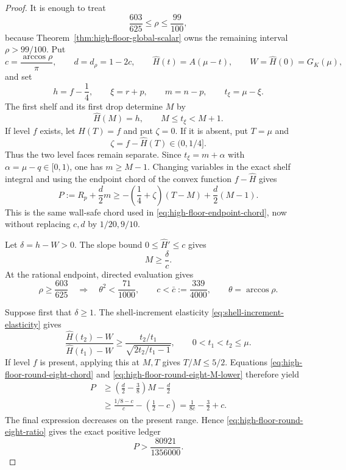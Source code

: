 \documentclass[11pt]{article}
\theoremstyle{remark}
\begin{document}
\begin{proof}
It is enough to treat
\[
 \frac{603}{625}\leq\rho\leq\frac{99}{100},
\]
because Theorem~\ref{thm:high-floor-global-scalar} owns the remaining
interval $\rho>99/100$.  Put
\[
 c=\frac{\arccos\rho}{\pi},\qquad d=d_\rho=1-2c,
 \qquad \widehat H(t)=A(\mu-t),\qquad
 W=\widehat H(0)=G_K(\mu),
\]
and set
\[
 h=f-\frac14,\qquad \xi=r+p,\qquad m=n-p,
 \qquad t_\xi=\mu-\xi.
\]
The first shelf and its first drop determine $M$ by
\[
 \widehat H(M)=h,\qquad M\leq t_\xi<M+1.
\]
If level $f$ exists, let $\widehat H(T)=f$ and put $\zeta=0$.
If it is absent, put $T=\mu$ and
\[
 \zeta=f-\widehat H(T)\in(0,1/4].
\]
Thus the two level faces remain separate.  Since
$t_\xi=m+\alpha$ with $\alpha=\mu-q\in[0,1)$, one has $m\geq M-1$.
Changing variables in the exact shelf integral and using the endpoint
chord of the convex function $f-\widehat H$ gives
\begin{equation}
 \boxed{
 P:=R_p+\frac d2m
 \geq-\left(\frac14+\zeta\right)(T-M)
       +\frac d2(M-1).}
 \label{eq:high-floor-round-eight-chord}
\end{equation}
This is the same wall-safe chord used in
\eqref{eq:high-floor-endpoint-chord}, now without replacing $c,d$ by
$1/20,9/10$.

Let $\delta=h-W>0$.  The slope bound
$0\leq\widehat H'\leq c$ gives
\begin{equation}
 M\geq\frac{\delta}{c}.
 \label{eq:high-floor-round-eight-M-lower}
\end{equation}
At the rational endpoint, directed evaluation gives
\begin{equation}
 \rho\geq\frac{603}{625}
 \quad\Longrightarrow\quad
 \theta^2<\frac{71}{1000},\qquad
 c<\bar c:=\frac{339}{4000},
 \qquad \theta=\arccos\rho.
 \label{eq:high-floor-round-eight-ratio}
\end{equation}

Suppose first that $\delta\geq1$.  The shell-increment elasticity
\eqref{eq:shell-increment-elasticity} gives
\begin{equation}
 \frac{\widehat H(t_2)-W}{\widehat H(t_1)-W}
 \geq\frac{t_2/t_1}{\sqrt{2t_2/t_1-1}},
 \qquad 0<t_1<t_2\leq\mu.
 \label{eq:high-floor-round-eight-elasticity}
\end{equation}
If level $f$ is present, applying this at $M,T$ gives $T/M\leq5/2$.
Equations \eqref{eq:high-floor-round-eight-chord} and
\eqref{eq:high-floor-round-eight-M-lower} therefore yield
\[
\begin{aligned}
 P
 &\geq\left(\frac d2-\frac38\right)M-\frac d2\\
 &\geq\frac{1/8-c}{c}-\left(\frac12-c\right)
 =\frac1{8c}-\frac32+c.
\end{aligned}
\]
The final expression decreases on the present range.  Hence
\eqref{eq:high-floor-round-eight-ratio} gives the exact positive ledger
\begin{equation}
 \boxed{P>\frac{80921}{1356000}.}
 \label{eq:high-floor-round-eight-present}
\end{equation}


\end{proof}
\end{document}
